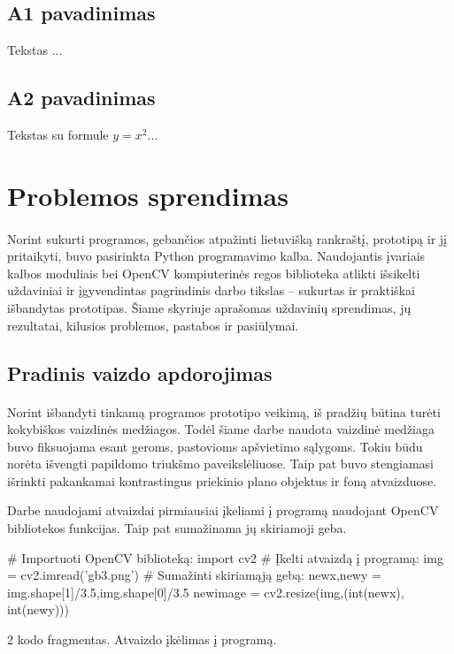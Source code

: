 \documentclass[a4paper,12pt]{article}
\begin{document}
\subsection{A1 pavadinimas}
 Tekstas ...
 \subsection{A2 pavadinimas}
 Tekstas su formule $y=x^2$...
 
 
 \section{Problemos sprendimas}

\paragraph{} Norint sukurti programos, gebančios atpažinti lietuvišką rankraštį, prototipą ir jį pritaikyti, buvo pasirinkta Python programavimo kalba. Naudojantis įvariais kalbos moduliais bei OpenCV kompiuterinės regos biblioteka atlikti išsikelti uždaviniai ir įgyvendintas pagrindinis darbo tikslas – sukurtas ir praktiškai išbandytas prototipas. Šiame skyriuje aprašomas uždavinių sprendimas, jų rezultatai, kilusios problemos, pastabos ir pasiūlymai. 

\subsection{Pradinis vaizdo apdorojimas}
 \paragraph{} Norint išbandyti tinkamą programos prototipo veikimą, iš pradžių būtina turėti kokybiškos vaizdinės medžiagos. Todėl šiame darbe naudota vaizdinė medžiaga buvo fiksuojama esant geroms, pastovioms apšvietimo sąlygoms. Tokiu būdu norėta išvengti papildomo triukšmo paveikslėliuose. Taip pat buvo stengiamasi išrinkti pakankamai kontrastingus priekinio plano objektus ir foną atvaizduose.
 
 Darbe naudojami atvaizdai pirmiausiai įkeliami į programą naudojant OpenCV bibliotekos funkcijas. Taip pat sumažinama jų skiriamoji geba.
\begin{listing}[H]
	\begin{pythoncode}
		# Importuoti OpenCV biblioteką:
		import cv2
		# Įkelti atvaizdą į programą:
		img = cv2.imread('gb3.png')
		# Sumažinti skiriamąją gebą:
		newx,newy = img.shape[1]/3.5,img.shape[0]/3.5
		newimage = cv2.resize(img,(int(newx), int(newy)))
	\end{pythoncode}
	\begin{center}
		2 kodo fragmentas. Atvaizdo įkėlimas į programą.
	\end{center}		
\end{listing}
\end{document}
